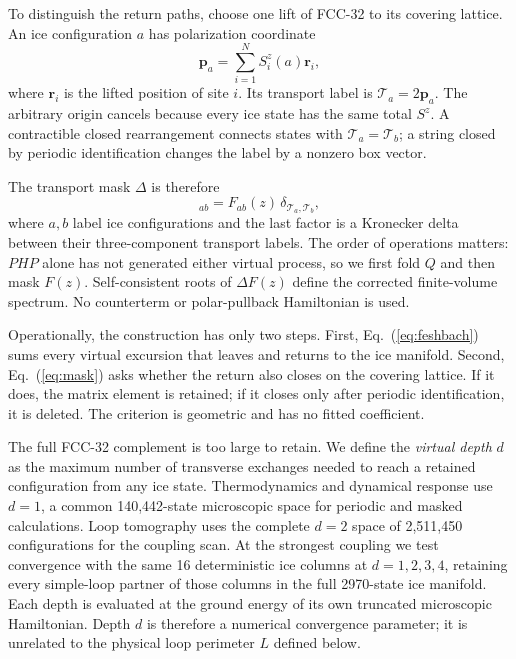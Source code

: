 \documentclass[aps,prb,twocolumn,amsmath,amssymb,superscriptaddress,
longbibliography,floatfix]{revtex4-2}
\newcommand{\br}{\bm r}
\begin{document}
To distinguish the return paths, choose one lift of FCC-32 to its covering
lattice.  An ice configuration $a$ has polarization coordinate
\begin{equation}
 \bm p_a=\sum_{i=1}^{N}S_i^z(a)\br_i,
 \label{eq:polarization}
\end{equation}
where $\br_i$ is the lifted position of site $i$.  Its transport label is
$\mathcal T_a=2\bm p_a$.  The arbitrary origin cancels because every ice
state has the same total $S^z$.  A contractible closed rearrangement connects
states with $\mathcal T_a=\mathcal T_b$; a string closed by periodic
identification changes the label by a nonzero box vector.

The transport mask $\Delta$ is therefore
\begin{equation}
 [\Delta F(z)]_{ab}=F_{ab}(z)\,
 \delta_{\mathcal T_a,\mathcal T_b},
 \label{eq:mask}
\end{equation}
where $a,b$ label ice configurations and the last factor is a Kronecker
delta between their three-component transport labels.  The order of
operations matters: $PHP$ alone has not generated either virtual process, so
we first fold $Q$ and then mask $F(z)$.  Self-consistent roots of
$\Delta F(z)$ define the corrected finite-volume spectrum.  No counterterm or
polar-pullback Hamiltonian is used.

Operationally, the construction has only two steps.  First, Eq.~(\ref{eq:feshbach})
sums every virtual excursion that leaves and returns to the ice manifold.
Second, Eq.~(\ref{eq:mask}) asks whether the return also closes on the covering
lattice.  If it does, the matrix element is retained; if it closes only after
periodic identification, it is deleted.  The criterion is geometric and has
no fitted coefficient.

The full FCC-32 complement is too large to retain.  We define the
\emph{virtual depth} $d$ as the maximum number of transverse exchanges needed
to reach a retained configuration from any ice state.  Thermodynamics and
dynamical response use $d=1$, a common 140,442-state microscopic space for
periodic and masked calculations.  Loop tomography uses the complete
$d=2$ space of 2,511,450 configurations for the coupling scan.  At the
strongest coupling we test convergence with the same 16 deterministic ice
columns at $d=1,2,3,4$, retaining every simple-loop partner of those columns
in the full 2970-state ice manifold.  Each depth is evaluated at the ground
energy of its own truncated microscopic Hamiltonian.  Depth $d$ is therefore
a numerical convergence parameter; it is unrelated to the physical loop
perimeter $L$ defined below.
\end{document}
